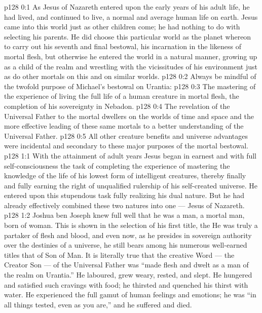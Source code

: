 \author{Midwayer Commission}
\vs p128 0:1 As Jesus of Nazareth entered upon the early years of his adult life, he had lived, and continued to live, a normal and average human life on earth. Jesus came into this world just as other children come; he had nothing to do with selecting his parents. He did choose this particular world as the planet whereon to carry out his seventh and final bestowal, his incarnation in the likeness of mortal flesh, but otherwise he entered the world in a natural manner, growing up as a child of the realm and wrestling with the vicissitudes of his environment just as do other mortals on this and on similar worlds.
\vs p128 0:2 Always be mindful of the twofold purpose of Michael’s bestowal on Urantia:
\vs p128 0:3 \bibnobreakspace The mastering of the experience of living the full life of a human creature in mortal flesh, the completion of his sovereignty in Nebadon.
\vs p128 0:4 \bibnobreakspace The revelation of the Universal Father to the mortal dwellers on the worlds of time and space and the more effective leading of these same mortals to a better understanding of the Universal Father.
\vs p128 0:5 \pc All other creature benefits and universe advantages were incidental and secondary to these major purposes of the mortal bestowal.
\vs p128 1:1 With the attainment of adult years Jesus began in earnest and with full self\hyp{}consciousness the task of completing the experience of mastering the knowledge of the life of his lowest form of intelligent creatures, thereby finally and fully earning the right of unqualified rulership of his self\hyp{}created universe. He entered upon this stupendous task fully realizing his dual nature. But he had already effectively combined these two natures into one --- Jesus of Nazareth.
\vs p128 1:2 Joshua ben Joseph knew full well that he was a man, a mortal man, born of woman. This is shown in the selection of his first title, the  He was truly a partaker of flesh and blood, and even now, as he presides in sovereign authority over the destinies of a universe, he still bears among his numerous well\hyp{}earned titles that of Son of Man. It is literally true that the creative Word --- the Creator Son --- of the Universal Father was “made flesh and dwelt as a man of the realm on Urantia.” He laboured, grew weary, rested, and slept. He hungered and satisfied such cravings with food; he thirsted and quenched his thirst with water. He experienced the full gamut of human feelings and emotions; he was “in all things tested, even as you are,” and he suffered and died.
